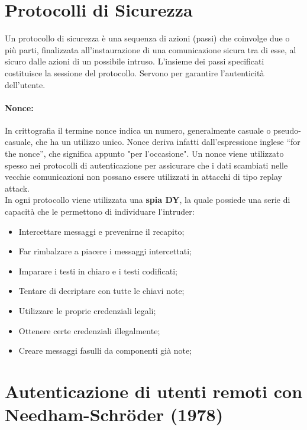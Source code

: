\section{Protocolli di Sicurezza}

Un protocollo di sicurezza è una sequenza di azioni (passi) che
coinvolge due o più parti,
finalizzata all’instaurazione di una comunicazione sicura tra di esse,
al sicuro dalle azioni di un
possibile intruso. L’insieme dei passi specificati costituisce la sessione
del protocollo.
Servono per garantire l’autenticità dell’utente.

\paragraph{Nonce: }
In crittografia il termine nonce indica un numero, generalmente casuale
o pseudo-casuale,
che ha un utilizzo unico. Nonce deriva infatti dall'espressione inglese
“for the nonce”, che significa
appunto "per l'occasione". Un nonce viene utilizzato spesso nei protocolli
di autenticazione per
assicurare che i dati scambiati nelle vecchie comunicazioni non possano
essere utilizzati in
attacchi di tipo replay attack.\\

In ogni protocollo viene utilizzata una \textbf{spia DY}, la quale possiede una serie di capacità che le
permettono di individuare l’intruder:
\begin{itemize}
    \item Intercettare messaggi e prevenirne il recapito;
    \item Far rimbalzare a piacere i messaggi intercettati;
    \item Imparare i testi in chiaro e i testi codificati;
    \item Tentare di decriptare con tutte le chiavi note;
    \item Utilizzare le proprie credenziali legali;
    \item Ottenere certe credenziali illegalmente;
    \item Creare messaggi fasulli da componenti già note;
\end{itemize}

\section{Autenticazione di utenti remoti con Needham-Schr\"{o}der (1978)}

